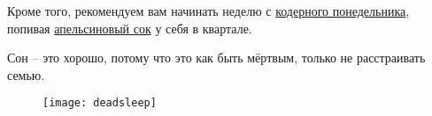 Кроме того, рекомендуем вам начинать неделю с
\href{https://freecx.github.io/}{кодерного понедельника},
попивая \href{https://citrux.github.io/blog/}{апельсиновый сок} у себя в квартале.

\pagebreak

\begin{center}
    \Huge{Сон -- это хорошо, потому что это как быть мёртвым, только не расстраивать семью.}
\end{center}
\begin{figure}[ht!]
    \centering
    \texttt{[image: deadsleep]}
\end{figure}

